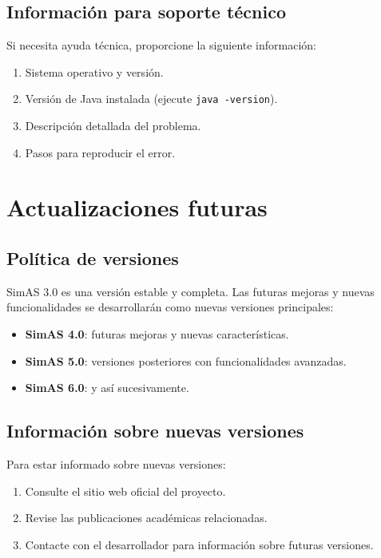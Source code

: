 \subsection{Información para soporte técnico}

Si necesita ayuda técnica, proporcione la siguiente información:

\begin{enumerate}
    \item Sistema operativo y versión.
    \item Versión de Java instalada (ejecute \texttt{java -version}).
    \item Descripción detallada del problema.
    \item Pasos para reproducir el error.
\end{enumerate}

\section{Actualizaciones futuras}

\subsection{Política de versiones}

SimAS 3.0 es una versión estable y completa. Las futuras mejoras y nuevas funcionalidades se desarrollarán como nuevas versiones principales:

\begin{itemize}
    \item \textbf{SimAS 4.0}: futuras mejoras y nuevas características.
    \item \textbf{SimAS 5.0}: versiones posteriores con funcionalidades avanzadas.
    \item \textbf{SimAS 6.0}: y así sucesivamente.
\end{itemize}

\subsection{Información sobre nuevas versiones}

Para estar informado sobre nuevas versiones:

\begin{enumerate}
    \item Consulte el sitio web oficial del proyecto.
    \item Revise las publicaciones académicas relacionadas.
    \item Contacte con el desarrollador para información sobre futuras versiones.
\end{enumerate}

